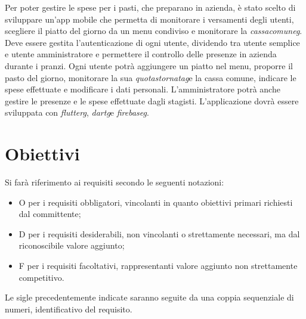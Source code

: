 Per poter gestire le spese per i pasti, che preparano in azienda, è stato scelto di sviluppare un'app mobile che permetta di monitorare i versamenti degli utenti, scegliere il piatto del giorno da un menu condiviso e monitorare la \emph{\gls{cassacomuneg}}\glsfirstoccur.\newline
Deve essere gestita l'autenticazione di ogni utente, dividendo tra utente semplice e utente amministratore e permettere il controllo delle presenze in azienda durante i pranzi. \newline
Ogni utente potrà aggiungere un piatto nel menu, proporre il pasto del giorno, monitorare la sua \emph{\gls{quotastornatag}}\glsfirstoccur e la cassa comune, indicare le spese effettuate e modificare i dati personali. \newline
L'amministratore potrà anche gestire le presenze e le spese effettuate dagli stagisti.
L'applicazione dovrà essere sviluppata con \emph{\gls{flutterg}}\glsfirstoccur, \emph{\gls{dartg}}\glsfirstoccur  e \emph{\gls{firebaseg}}\glsfirstoccur.

\section{Obiettivi}
\label{sec:obbiettivi}

Si farà riferimento ai requisiti secondo le seguenti notazioni:
\begin{itemize}
    \item O per i requisiti obbligatori, vincolanti in quanto obiettivi primari richiesti dal committente;
    \item D per i requisiti desiderabili, non vincolanti o strettamente necessari, ma dal riconoscibile valore aggiunto;
    \item F per i requisiti facoltativi, rappresentanti valore aggiunto non strettamente competitivo.
\end{itemize}
Le sigle precedentemente indicate saranno seguite da una coppia sequenziale di numeri, identificativo del requisito.\newline

